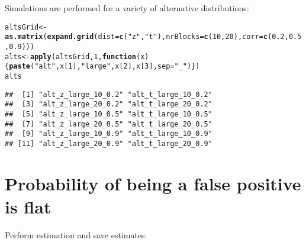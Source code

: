 \documentclass{article}\usepackage[]{graphicx}\usepackage[]{color}
\makeatletter
\newcommand{\hlnum}[1]{\textcolor[rgb]{0.686,0.059,0.569}{#1}}%
\newcommand{\hlstr}[1]{\textcolor[rgb]{0.192,0.494,0.8}{#1}}%
\newcommand{\hlstd}[1]{\textcolor[rgb]{0.345,0.345,0.345}{#1}}%
\newcommand{\hlkwa}[1]{\textcolor[rgb]{0.161,0.373,0.58}{\textbf{#1}}}%
\newcommand{\hlkwb}[1]{\textcolor[rgb]{0.69,0.353,0.396}{#1}}%
\newcommand{\hlkwc}[1]{\textcolor[rgb]{0.333,0.667,0.333}{#1}}%
\newcommand{\hlkwd}[1]{\textcolor[rgb]{0.737,0.353,0.396}{\textbf{#1}}}%
\newenvironment{kframe}{%
 \def\at@end@of@kframe{}%
 \ifinner\ifhmode%
  \def\at@end@of@kframe{\end{minipage}}%
  \begin{minipage}{\columnwidth}%
 \fi\fi%
 \def\FrameCommand##1{\hskip\@totalleftmargin \hskip-\fboxsep
 \colorbox{shadecolor}{##1}\hskip-\fboxsep
     \hskip-\linewidth \hskip-\@totalleftmargin \hskip\columnwidth}%
 \MakeFramed {\advance\hsize-\width
   \@totalleftmargin\z@ \linewidth\hsize
   \@setminipage}}%
 {\par\unskip\endMakeFramed%
 \at@end@of@kframe}
\newenvironment{knitrout}{}{} %
\makeatother
\begin{document}
Simulations are performed for a variety of alternative distributions:
\begin{knitrout}
\color{fgcolor}\begin{kframe}
\begin{alltt}
\hlstd{altsGrid} \hlkwb{<-} \hlkwd{as.matrix}\hlstd{(}\hlkwd{expand.grid}\hlstd{(}\hlkwc{dist}\hlstd{=}\hlkwd{c}\hlstd{(}\hlstr{"z"}\hlstd{,}\hlstr{"t"}\hlstd{),}\hlkwc{nrBlocks}\hlstd{=}\hlkwd{c}\hlstd{(}\hlnum{10}\hlstd{,}\hlnum{20}\hlstd{),}\hlkwc{corr}\hlstd{=}\hlkwd{c}\hlstd{(}\hlnum{0.2}\hlstd{,}\hlnum{0.5}\hlstd{,}\hlnum{0.9}\hlstd{)))}
\hlstd{alts} \hlkwb{<-} \hlkwd{apply}\hlstd{(altsGrid,} \hlnum{1}\hlstd{,} \hlkwa{function}\hlstd{(}\hlkwc{x}\hlstd{)\{}\hlkwd{paste}\hlstd{(}\hlstr{"alt"}\hlstd{,x[}\hlnum{1}\hlstd{],}\hlstr{"large"}\hlstd{,x[}\hlnum{2}\hlstd{],x[}\hlnum{3}\hlstd{],}\hlkwc{sep}\hlstd{=}\hlstr{"_"}\hlstd{)\})}
\hlstd{alts}
\end{alltt}
\begin{verbatim}
##  [1] "alt_z_large_10_0.2" "alt_t_large_10_0.2"
##  [3] "alt_z_large_20_0.2" "alt_t_large_20_0.2"
##  [5] "alt_z_large_10_0.5" "alt_t_large_10_0.5"
##  [7] "alt_z_large_20_0.5" "alt_t_large_20_0.5"
##  [9] "alt_z_large_10_0.9" "alt_t_large_10_0.9"
## [11] "alt_z_large_20_0.9" "alt_t_large_20_0.9"
\end{verbatim}
\end{kframe}
\end{knitrout}

\section{Probability of being a false positive is flat}

Perform estimation and save estimates:
\end{document}
